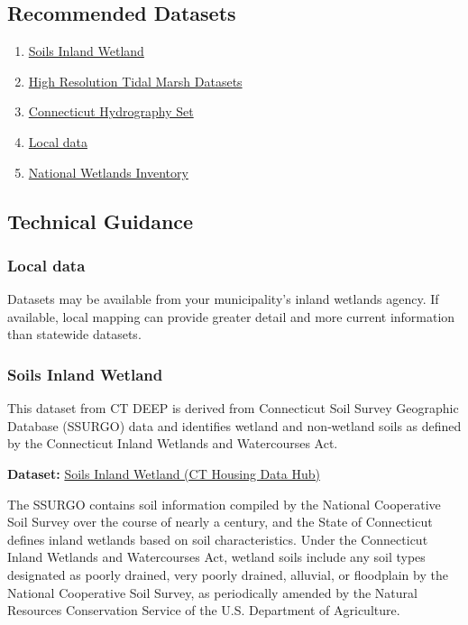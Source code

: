 \documentclass[
  letterpaper,
  DIV=11,
  numbers=noendperiod]{scrreprt}
\providecommand{\tightlist}{%
  \setlength{\itemsep}{0pt}\setlength{\parskip}{0pt}}
\begin{document}
\subsection{Recommended Datasets}\label{recommended-datasets-1}

\begin{enumerate}
\def\labelenumi{\arabic{enumi}.}
\tightlist
\item
  \hyperref[sec-soils-inland-wetland]{Soils Inland Wetland}
\item
  \hyperref[sec-high-resolution-tidal-marsh-datasets]{High Resolution
  Tidal Marsh Datasets}
\item
  \hyperref[sec-connecticut-hydrography-set]{Connecticut Hydrography
  Set}
\item
  \hyperref[sec-local-data3]{Local data}
\item
  \hyperref[sec-nwi]{National Wetlands Inventory}
\end{enumerate}

\subsection{Technical Guidance}\label{technical-guidance-2}

\subsubsection{Local data}\label{sec-local-data3}

Datasets may be available from your municipality's inland wetlands
agency. If available, local mapping can provide greater detail and more
current information than statewide datasets.

\subsubsection{Soils Inland Wetland}\label{sec-soils-inland-wetland}

This dataset from CT DEEP is derived from Connecticut Soil Survey
Geographic Database (SSURGO) data and identifies wetland and non‑wetland
soils as defined by the Connecticut Inland Wetlands and Watercourses
Act.

\textbf{Dataset:}
\href{https://housingmaps.ct.gov/datasets/CTDEEP::soils-inland-wetland/about}{Soils
Inland Wetland (CT Housing Data Hub)}

The SSURGO contains soil information compiled by the National
Cooperative Soil Survey over the course of nearly a century, and the
State of Connecticut defines inland wetlands based on soil
characteristics. Under the Connecticut Inland Wetlands and Watercourses
Act, wetland soils include any soil types designated as poorly drained,
very poorly drained, alluvial, or floodplain by the National Cooperative
Soil Survey, as periodically amended by the Natural Resources
Conservation Service of the U.S. Department of Agriculture.
\end{document}
